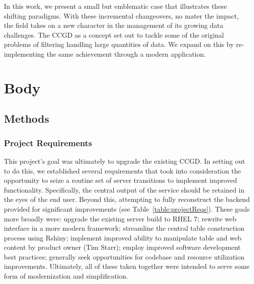 \documentclass[10pt]{report}
\begin{document}
In this work, we present a small but emblematic case that illustrates these shifting paradigms. With these incremental changeovers, no mater the impact, the field takes on a new character in the management of its growing data challenges. The CCGD as a concept set out to tackle some of the original problems of filtering handling large quantities of data. We expand on this by re-implementing the same achievement through a modern application.






\chapter{Body}

\section{Methods}

\subsection{Project Requirements}
This project's goal was ultimately to upgrade the existing CCGD\@. In setting out to do this, we established several requirements that took into consideration the opportunity to seize a routine set of server transitions to implement improved functionality. Specifically, the central output of the service should be retained in the eyes of the end user. Beyond this, attempting to fully reconstruct the backend provided for significant improvements (see Table~\ref{table:projectReqs}). These goals more broadly were: upgrade the existing server build to RHEL 7; rewrite web interface in a more modern framework; streamline the central table construction process using Rshiny; implement improved ability to manipulate table and web content by product owner (Tim Starr); employ improved software development best practices; generally seek opportunities for codebase and resource utilization improvements. Ultimately, all of these taken together were intended to serve some form of modernization and simplification.
\end{document}

